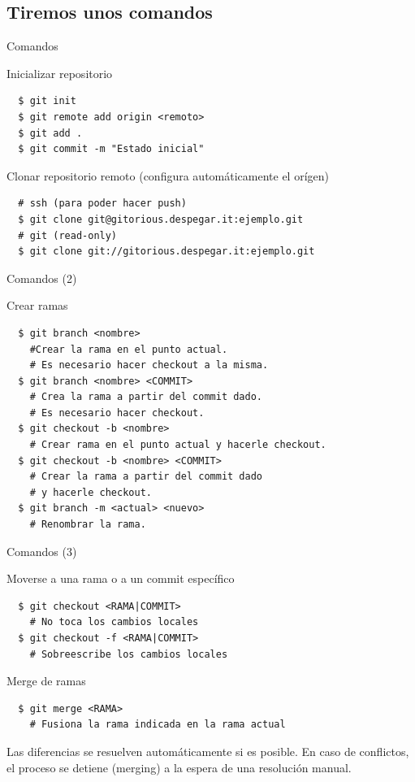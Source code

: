 \documentclass{beamer}
\begin{document}
\subsection{Tiremos unos comandos}

\begin{frame}[fragile]{Comandos}
  \begin{block}{Inicializar repositorio}
    \begin{verbatim}
  $ git init
  $ git remote add origin <remoto>
  $ git add .
  $ git commit -m "Estado inicial"
    \end{verbatim}
  \end{block} \pause
  
  \begin{block}{Clonar repositorio remoto (configura automáticamente el orígen)}
    \begin{verbatim}
  # ssh (para poder hacer push)
  $ git clone git@gitorious.despegar.it:ejemplo.git
  # git (read-only)
  $ git clone git://gitorious.despegar.it:ejemplo.git
    \end{verbatim}
  \end{block}
  
\end{frame}

\begin{frame}[fragile]{Comandos (2)}
  \begin{block}{Crear ramas}
    \begin{verbatim}
  $ git branch <nombre> 
    #Crear la rama en el punto actual.                 
    # Es necesario hacer checkout a la misma.
  $ git branch <nombre> <COMMIT>    
    # Crea la rama a partir del commit dado. 
    # Es necesario hacer checkout.
  $ git checkout -b <nombre>  
    # Crear rama en el punto actual y hacerle checkout.
  $ git checkout -b <nombre> <COMMIT>   
    # Crear la rama a partir del commit dado 
    # y hacerle checkout.
  $ git branch -m <actual> <nuevo>  
    # Renombrar la rama.
    \end{verbatim}
  \end{block}
\end{frame}

\begin{frame}[fragile]{Comandos (3)}
  \begin{block}{Moverse a una rama o a un commit específico}
    \begin{verbatim}
  $ git checkout <RAMA|COMMIT>
    # No toca los cambios locales
  $ git checkout -f <RAMA|COMMIT>
    # Sobreescribe los cambios locales
    \end{verbatim}
  \end{block} \pause
  
  \begin{block}{Merge de ramas}
    \begin{verbatim}
  $ git merge <RAMA>
    # Fusiona la rama indicada en la rama actual
    \end{verbatim}    
    Las diferencias se resuelven automáticamente si es posible. En caso de conflictos,
    el proceso se detiene (merging) a la espera de una resolución manual.
  \end{block}
\end{frame}
\end{document}
